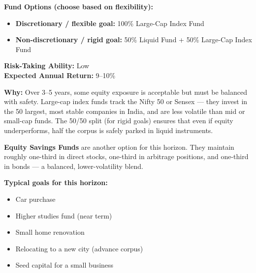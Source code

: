 \documentclass[12pt,a4paper]{article}
\begin{document}
\begin{tcolorbox}[base, colback=MedTerm!8, colframe=MedTerm,
  colbacktitle=MedTerm, coltitle=white, fonttitle=\bfseries,
  title={Horizon 2: 3--5 Years --- Cautious Growth}]

\textbf{Fund Options (choose based on flexibility):}
\begin{itemize}
  \item \textbf{Discretionary / flexible goal:} 100\% Large-Cap Index Fund
  \item \textbf{Non-discretionary / rigid goal:} 50\% Liquid Fund + 50\% Large-Cap Index Fund
\end{itemize}
\textbf{Risk-Taking Ability:} Low\\
\textbf{Expected Annual Return:} 9--10\%

\medskip
\textbf{Why:} Over 3--5 years, some equity exposure is acceptable but must be balanced with safety. Large-cap index funds track the Nifty 50 or Sensex --- they invest in the 50 largest, most stable companies in India, and are less volatile than mid or small-cap funds. The 50/50 split (for rigid goals) ensures that even if equity underperforms, half the corpus is safely parked in liquid instruments.

\medskip
\textbf{Equity Savings Funds} are another option for this horizon. They maintain roughly one-third in direct stocks, one-third in arbitrage positions, and one-third in bonds --- a balanced, lower-volatility blend.

\medskip
\textbf{Typical goals for this horizon:}
\begin{itemize}
  \item Car purchase
  \item Higher studies fund (near term)
  \item Small home renovation
  \item Relocating to a new city (advance corpus)
  \item Seed capital for a small business
\end{itemize}
\end{tcolorbox}

\vspace{3mm}
\end{document}
